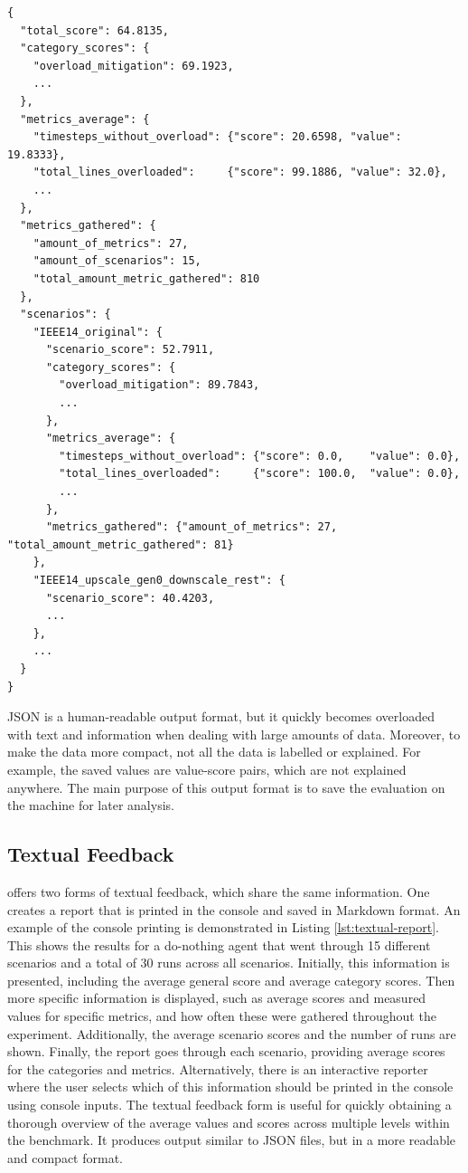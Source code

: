 \begin{listing}[htp]
\begin{verbatim}
{
  "total_score": 64.8135,
  "category_scores": {
    "overload_mitigation": 69.1923,
    ...
  },
  "metrics_average": {
    "timesteps_without_overload": {"score": 20.6598, "value": 19.8333},
    "total_lines_overloaded":     {"score": 99.1886, "value": 32.0},
    ...
  },
  "metrics_gathered": {
    "amount_of_metrics": 27,
    "amount_of_scenarios": 15,
    "total_amount_metric_gathered": 810
  },
  "scenarios": {
    "IEEE14_original": {
      "scenario_score": 52.7911,
      "category_scores": {
        "overload_mitigation": 89.7843,
        ...
      },
      "metrics_average": {
        "timesteps_without_overload": {"score": 0.0,    "value": 0.0},
        "total_lines_overloaded":     {"score": 100.0,  "value": 0.0},
        ...
      },
      "metrics_gathered": {"amount_of_metrics": 27, "total_amount_metric_gathered": 81}
    },
    "IEEE14_upscale_gen0_downscale_rest": {
      "scenario_score": 40.4203,
      ...
    },
    ...
  }
}
\end{verbatim}
\caption{Exemplary \textit{statistics.json} output for the do-nothing baseline agent.}
\label{lst:statistics-json}
\end{listing}

JSON is a human-readable output format, but it quickly becomes overloaded with text and information when dealing with large amounts of data. Moreover, to make the data more compact, not all the data is labelled or explained. For example, the saved values are value-score pairs, which are not explained anywhere. The main purpose of this output format is to save the evaluation on the machine for later analysis.

\subsection{Textual Feedback}\label{ssec:textual-feedback} 
\benchmark offers two forms of textual feedback, which share the same information. One creates a report that is printed in the console and saved in Markdown format. An example of the console printing is demonstrated in Listing \ref{lst:textual-report}. This shows the results for a do-nothing agent that went through 15 different scenarios and a total of 30 runs across all scenarios. 
Initially, this information is presented, including the average general score and average category scores. Then more specific information is displayed, such as average scores and measured values for specific metrics, and how often these were gathered throughout the experiment. Additionally, the average scenario scores and the number of runs are shown. Finally, the report goes through each scenario, providing average scores for the categories and metrics. Alternatively, there is an interactive reporter where the user selects which of this information should be printed in the console using console inputs. The textual feedback form is useful for quickly obtaining a thorough overview of the average values and scores across multiple levels within the benchmark. It produces output similar to JSON files, but in a more readable and compact format. 

